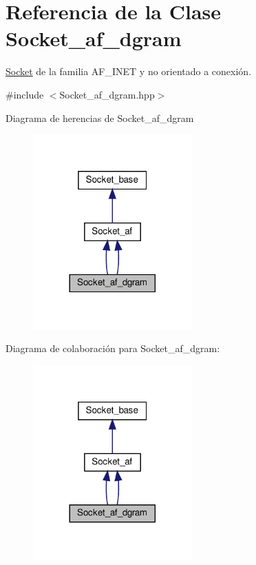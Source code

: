 \hypertarget{classSocket__af__dgram}{}\section{Referencia de la Clase Socket\+\_\+af\+\_\+dgram}
\label{classSocket__af__dgram}


\hyperlink{classSocket}{Socket} de la familia A\+F\+\_\+\+I\+N\+ET y no orientado a conexión.  




{\ttfamily \#include $<$Socket\+\_\+af\+\_\+dgram.\+hpp$>$}



Diagrama de herencias de Socket\+\_\+af\+\_\+dgram\nopagebreak
\begin{figure}[H]
\begin{center}
\leavevmode
\includegraphics[width=173pt]{classSocket__af__dgram__inherit__graph}
\end{center}
\end{figure}


Diagrama de colaboración para Socket\+\_\+af\+\_\+dgram\+:\nopagebreak
\begin{figure}[H]
\begin{center}
\leavevmode
\includegraphics[width=173pt]{classSocket__af__dgram__coll__graph}
\end{center}
\end{figure}
